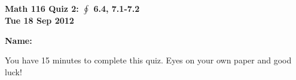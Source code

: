 \documentclass[11pt,letterpaper]{article}
\begin{document}
\flushleft
\begin{multicols}{2}


\begin{large}\textbf{Math 116 Quiz 2: $\oint$ 6.4, 7.1-7.2 \\
Tue 18 Sep 2012}\end{large}

\textbf{Name:  }\underline{\hspace{35ex}}

\vspace{.5in}

\end{multicols}

\pagestyle{empty}


\flushleft

You have 15 minutes to complete this quiz.  Eyes on your own paper and good luck!
\end{document}
